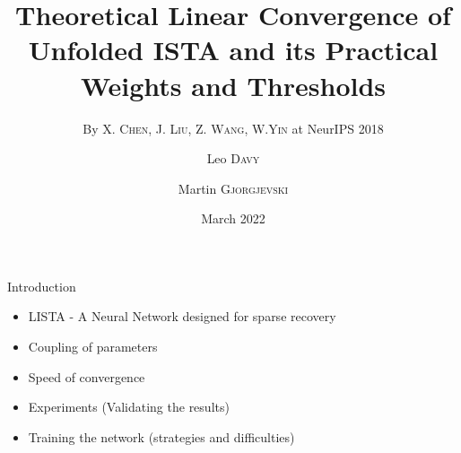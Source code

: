 \documentclass{beamer}
\title[Learned ISTA]{Theoretical Linear Convergence of Unfolded ISTA and its Practical Weights and Thresholds}
\subtitle{By X. \textsc{Chen}, J. \textsc{Liu}, Z. \textsc{Wang}, W.\textsc{Yin}
at NeurIPS 2018}
\author[Leo \textsc{Davy} \and Martin \textsc{Gjorgjevski}] %
{Leo \textsc{Davy} \and Martin \textsc{Gjorgjevski}}
\institute[ENS Lyon] %
{
  ENS Lyon \\
  M2 Advanced Mathematics}
\date[Short Occasion] %
{March 2022}
\begin{document}
\maketitle

\begin{frame}{Introduction}

\begin{itemize}
    \item LISTA - A Neural Network designed for sparse recovery
    \item Coupling of parameters
    \item Speed of convergence 
    \item Experiments (Validating the results)
    \item Training the network (strategies and difficulties)
\end{itemize}
    
\end{frame}
\end{document}

